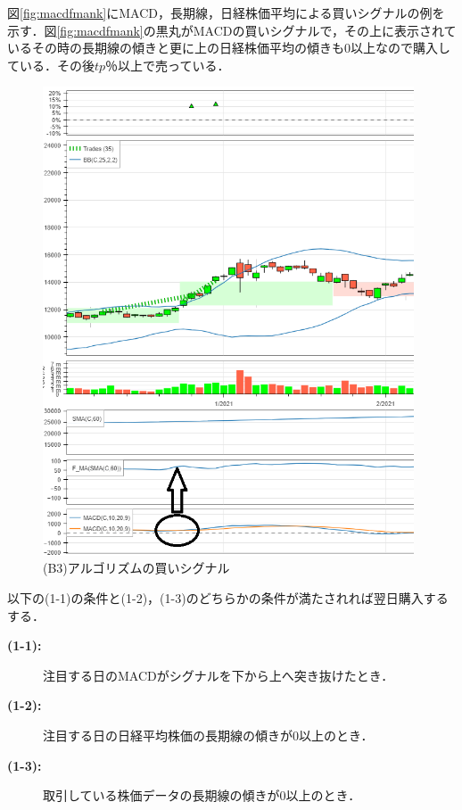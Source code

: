      図\ref{fig:macdfmank}にMACD，長期線，日経株価平均による買いシグナルの例を示す．図\ref{fig:macdfmank}の黒丸がMACDの買いシグナルで，その上に表示されているその時の長期線の傾きと更に上の日経株価平均の傾きも0以上なので購入している．その後$tp$％以上で売っている．
  \begin{description}
    \begin{figure}[t]
      \centering
      \includegraphics[width=110mm]{fig/macd_nk_paint.png}
      \caption{(B3)アルゴリズムの買いシグナル}
      \label{fig:macdnk}
     \end{figure}
    
    \item [\textbf{(B5):}]
    \item[\textbf{Step~1~:}]以下の(1-1)の条件と(1-2)，(1-3)のどちらかの条件が満たされれば翌日購入するする．
    \begin{description}
      \item[\textbf{(1-1):}]注目する日のMACDがシグナルを下から上へ突き抜けたとき．
      \item[\textbf{(1-2):}]注目する日の日経平均株価の長期線の傾きが0以上のとき．
      \item[\textbf{(1-3):}]取引している株価データの長期線の傾きが0以上のとき． 

     \end{description}  
    

\end{description}
